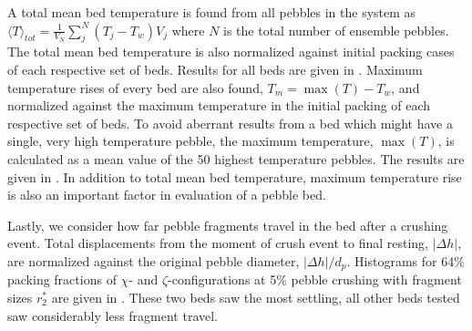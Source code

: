 A total mean bed temperature is found from all pebbles in the system as $\langle T\rangle_{tot} = \frac{1}{V_N}\sum_{j}^N (T_j-T_w) V_j$ where $N$ is the total number of ensemble pebbles. The total mean bed temperature is also normalized against initial packing cases of each respective set of beds. Results for all beds are given in . Maximum temperature rises of every bed are also found, $T_m = \max(T) - T_w$, and normalized against the maximum temperature in the initial packing of each respective set of beds. To avoid aberrant results from a bed which might have a single, very high temperature pebble, the maximum temperature, $\max(T)$, is calculated as a mean value of the 50 highest temperature pebbles. The results are given in . In addition to total mean bed temperature, maximum temperature rise is also an important factor in evaluation of a pebble bed.

Lastly, we consider how far pebble fragments travel in the bed after a crushing event. Total displacements from the moment of crush event to final resting, $|\Delta h|$, are normalized against the original pebble diameter, $|\Delta h|/d_p$. Histograms for 64\% packing fractions of $\chi$- and $\zeta$-configurations at 5\% pebble crushing with fragment sizes $r_2^*$ are given in . These two beds saw the most settling, all other beds tested saw considerably less fragment travel.









